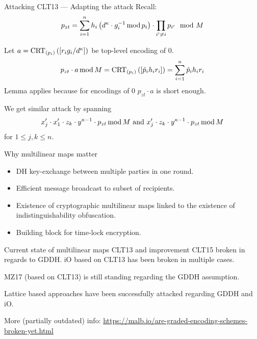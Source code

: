 \documentclass[english]{beamer}
\begin{document}
    \begin{frame}{Attacking CLT13 --- Adapting the attack}
        Recall:
        \begin{equation*}
            p_{zt} = \sum_{i=1}^n h_i \left(d^\kappa \cdot g_i^{-1} \operatorname{mod} p_i\right) \cdot \prod_{i' \neq i} p_{i'} \mod M
        \end{equation*}

        \pause
        Let $a = \operatorname{CRT}_{(p_{i})}\left(\left[r_i g_i / d^\kappa\right]\right)$ be top-level encoding of 0.
        \begin{equation*}
            p_{zt} \cdot a \operatorname{mod} M = \operatorname{CRT}_{(p_{i})}\left(\left[\hat{p}_i h_i r_i\right]\right) = \sum_{i = 1}^n \hat{p}_i h_i r_i
        \end{equation*}
        Lemma applies because for encodings of 0 $p_{zt} \cdot a$ is short enough.

        \pause
        We get similar attack by spanning
        \begin{equation*}
            x'_j \cdot x'_1 \cdot z_k \cdot y^{\kappa - 1} \cdot p_{zt} \operatorname{mod} M \text{ and } x'_j \cdot z_k \cdot y^{\kappa - 1} \cdot p_{zt} \operatorname{mod} M
        \end{equation*}
        for $1 \leq j,k \leq n$.
    \end{frame}
    \begin{frame}{Why multilinear maps matter}
        \begin{itemize}
            \item DH key-exchange between multiple parties in one round.
            \item Efficient message broadcast to subset of recipients.
            \item Existence of cryptographic multilinear maps linked to the existence of indistinguishability obfuscation.
            \item Building block for time-lock encryption.
        \end{itemize}
    \end{frame}
    \begin{frame}{Current state of multilinear maps}
        CLT13 and improvement CLT15 broken in regards to GDDH. iO based on CLT13 has been broken in multiple cases.

        MZ17 (based on CLT13) is still standing regarding the GDDH assumption.

        Lattice based approaches have been successfully attacked regarding GDDH and iO.

        More (partially outdated) info: \url{https://malb.io/are-graded-encoding-schemes-broken-yet.html}
    \end{frame}
\end{document}
